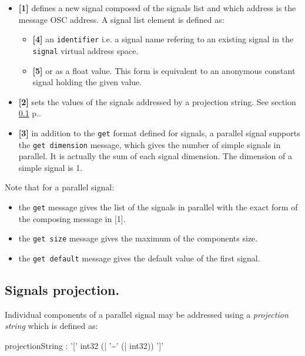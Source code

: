 \documentclass[a4paper,twoside]{report}
\newcommand{\subsublevel}[1]	{\subsection{#1}}
\newcommand{\fullref}[1]	{\ref{#1} p.\pageref{#1}}
\newcommand{\OSC}[1]		{\texttt{#1}}
\begin{document}
\begin{itemize}
\item \textbf{[1]} defines a new signal composed of the signals list and which address is the message OSC address. A signal list element is defined as:

\begin{itemize}
\item \textbf{[4]} an \OSC{identifier} i.e. a signal name refering to an existing signal in the \OSC{signal} virtual address space. 
\item \textbf{[5]} or as a float value. This form is equivalent to an anonymous constant signal holding the given value. 
\end{itemize}

\item \textbf{[2]} sets the values of the signals addressed by a projection string. See section \fullref{sigproj}. 
\item \textbf{[3]} in addition to the \OSC{get} format defined for signals, a parallel signal supports the \OSC{get dimension} message, which gives the number of simple signals in parallel. It is actually the sum of each signal dimension. The dimension of a simple signal is 1. 
\end{itemize}

Note that for a parallel signal:
\begin{itemize}
\item the \OSC{get} message gives the list of the signals in parallel with the exact form of the composing message in [1]. 
\item the \OSC{get size} message gives the maximum of the components size. 
\item the \OSC{get default} message gives the default value of the first signal. 
\end{itemize}

\subsublevel{Signals projection.}
\label{sigproj}
Individual components of a parallel signal may be addressed using a \emph{projection string} which is defined as:
\begin{rail}
projectionString :  '[' int32 (| '\~{}' (| int32)) ']'
\end{rail}
\end{document}
